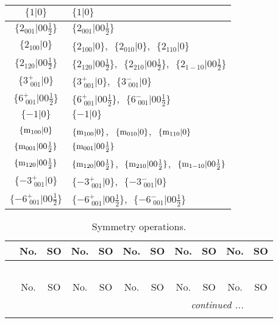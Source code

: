 \documentclass[fleqn,10pt,landscape]{article}
\begin{document}
\begin{itemize}
\begin{center}
\begin{longtable}{c|l}
$\{1|0\}$ & $\{1|0\}$ \\ \hline
$\{2{}_{001}|0 0 \frac{1}{2}\}$ & $\{2{}_{001}|0 0 \frac{1}{2}\}$ \\ \hline
$\{2{}_{100}|0\}$ & $\{2{}_{100}|0\}$,\,\, $\{2{}_{010}|0\}$,\,\, $\{2{}_{110}|0\}$ \\ \hline
$\{2{}_{120}|0 0 \frac{1}{2}\}$ & $\{2{}_{120}|0 0 \frac{1}{2}\}$,\,\, $\{2{}_{210}|0 0 \frac{1}{2}\}$,\,\, $\{2{}_{1-10}|0 0 \frac{1}{2}\}$ \\ \hline
$\{3^{+}_{\,\,001}|0\}$ & $\{3^{+}_{\,\,001}|0\}$,\,\, $\{3^{-}_{\,\,001}|0\}$ \\ \hline
$\{6^{+}_{\,\,001}|0 0 \frac{1}{2}\}$ & $\{6^{+}_{\,\,001}|0 0 \frac{1}{2}\}$,\,\, $\{6^{-}_{\,\,001}|0 0 \frac{1}{2}\}$ \\ \hline
$\{-1|0\}$ & $\{-1|0\}$ \\ \hline
$\{{\rm m}_{100}|0\}$ & $\{{\rm m}_{100}|0\}$,\,\, $\{{\rm m}_{010}|0\}$,\,\, $\{{\rm m}_{110}|0\}$ \\ \hline
$\{{\rm m}_{001}|0 0 \frac{1}{2}\}$ & $\{{\rm m}_{001}|0 0 \frac{1}{2}\}$ \\ \hline
$\{{\rm m}_{120}|0 0 \frac{1}{2}\}$ & $\{{\rm m}_{120}|0 0 \frac{1}{2}\}$,\,\, $\{{\rm m}_{210}|0 0 \frac{1}{2}\}$,\,\, $\{{\rm m}_{1-10}|0 0 \frac{1}{2}\}$ \\ \hline
$\{-3^{+}_{\,\,001}|0\}$ & $\{-3^{+}_{\,\,001}|0\}$,\,\, $\{-3^{-}_{\,\,001}|0\}$ \\ \hline
$\{-6^{+}_{\,\,001}|0 0 \frac{1}{2}\}$ & $\{-6^{+}_{\,\,001}|0 0 \frac{1}{2}\}$,\,\, $\{-6^{-}_{\,\,001}|0 0 \frac{1}{2}\}$ \\
\end{longtable}
\end{center}
\begin{center}
\renewcommand{\arraystretch}{1.3}
\begin{longtable}{c|cc|cc|cc|cc|cc}
\caption{Symmetry operations.}
 \\
 \hline \hline
 & No. & SO & No. & SO & No. & SO & No. & SO & No. & SO \\ \hline \endfirsthead

\multicolumn{10}{l}{\tablename\ \thetable{}} \\
 \hline \hline
 & No. & SO & No. & SO & No. & SO & No. & SO & No. & SO \\ \hline \endhead

 \hline \hline
\multicolumn{10}{r}{\footnotesize\it continued ...} \\ \endfoot


\end{longtable}
\end{center}
\end{itemize}
\end{document}

